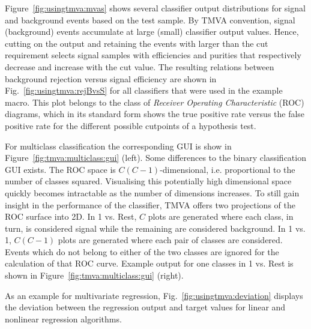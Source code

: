 Figure~\ref{fig:usingtmva:mvas} shows several classifier output 
distributions for signal and background events based on the test sample. 
By TMVA convention, signal (background) events accumulate at large 
(small) classifier output values. Hence, cutting on the output and retaining
the events with \yMVA larger than the cut requirement selects signal samples
with efficiencies and purities that respectively decrease and increase with 
the cut value. The resulting relations between background rejection versus 
signal efficiency are shown in Fig.~\ref{fig:usingtmva:rejBvsS} for all 
classifiers that were used in the example macro. This plot belongs to the 
class of {\em Receiver Operating Characteristic} (ROC) diagrams,
which in its standard form shows the true positive rate versus the false 
positive rate for the different possible cutpoints of a hypothesis test.

For multiclass classification the corresponding GUI is show in Figure~\ref{fig:tmva:multiclass:gui} (left). Some differences to the binary classification GUI exists.
The ROC space is $C(C-1)$-dimensional, i.e. proportional to the number of classes squared. Visualising this potentially high dimensional space quickly becomes intractable as the number of dimensions increases. To still gain insight in the performance of the classifier, TMVA offers two projections of the ROC surface into 2D.
In 1 vs. Rest, $C$ plots are generated where each class, in turn, is considered signal while the remaining are considered background.
In 1 vs. 1, $C(C-1)$ plots are generated where each pair of classes are considered. Events which do not belong to either of the two classes are ignored for the calculation of that ROC curve.
Example output for one classes in 1 vs. Rest is shown in Figure~\ref{fig:tmva:multiclass:gui} (right).

As an example for multivariate regression, Fig.~\ref{fig:usingtmva:deviation} displays
the deviation between the regression output and target values for linear and 
nonlinear regression algorithms. 

